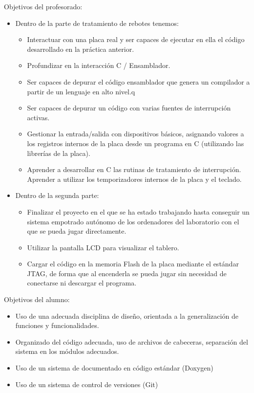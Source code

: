 \documentclass[12pt,letterpaper]{article}
\begin{document}
Objetivos del profesorado:
\begin{itemize}
\item Dentro de la parte de tratamiento de rebotes tenemos:
  \begin{itemize}
  \item Interactuar con una placa real y ser capaces de ejecutar
    en ella el código desarrollado en la práctica anterior.
  \item Profundizar en la interacción C / Ensamblador.
  \item Ser capaces de depurar el código ensamblador que genera un
    compilador a partir de un lenguaje en alto nivel.q
  \item Ser capaces de depurar un código con varias fuentes de
    interrupción activas.
  \item Gestionar la entrada/salida con dispositivos básicos,
    asignando valores a los registros internos de la placa desde
    un programa en C (utilizando las librerías de la placa).
  \item Aprender a desarrollar en C las rutinas de tratamiento de
    interrupción. Aprender a utilizar los temporizadores internos
    de la placa y el teclado.
  \end{itemize}
\item Dentro de la segunda parte:
  \begin{itemize}
  \item Finalizar el proyecto en el que se ha estado trabajando
    hasta conseguir un sistema empotrado autónomo de los
    ordenadores del laboratorio con el que se pueda jugar
    directamente.
  \item Utilizar la pantalla LCD para visualizar el tablero.
  \item Cargar el código en la memoria Flash de la placa mediante
    el estándar JTAG, de forma que al encenderla se pueda jugar
    sin necesidad de conectarse ni descargar el programa.
  \end{itemize}
\end{itemize}

Objetivos del alumno:
\begin{itemize}
\item Uso de una adecuada disciplina de diseño, orientada a la
  generalización de funciones y funcionalidades.
\item Organizado del código adecuada, uso de archivos de cabeceras,
  separación del sistema en los módulos adecuados.
\item Uso de un sistema de documentado en código estándar (Doxygen)
\item Uso de un sistema de control de versiones (Git)
\end{itemize}
\end{document}
